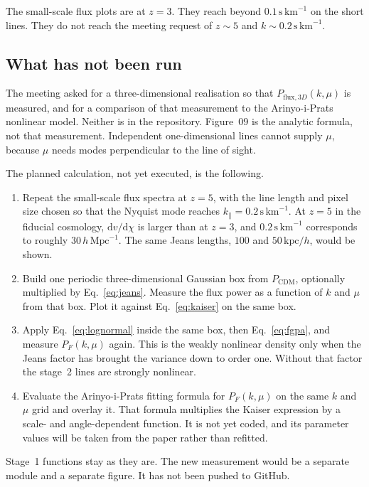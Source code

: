 \documentclass[11pt]{article}
\begin{document}
The small-scale flux plots are at $z=3$. They reach beyond $0.1\,\mathrm{s\,km}^{-1}$ on the short lines. They do not reach the meeting request of $z\sim 5$ and $k\sim 0.2\,\mathrm{s\,km}^{-1}$.

\subsection{What has not been run}

The meeting asked for a three-dimensional realisation so that $P_{\mathrm{flux},3D}(k,\mu)$ is measured, and for a comparison of that measurement to the Arinyo-i-Prats nonlinear model. Neither is in the repository. Figure~09 is the analytic formula, not that measurement. Independent one-dimensional lines cannot supply $\mu$, because $\mu$ needs modes perpendicular to the line of sight.

The planned calculation, not yet executed, is the following.

\begin{enumerate}
\item Repeat the small-scale flux spectra at $z=5$, with the line length and pixel size chosen so that the Nyquist mode reaches $k_\parallel=0.2\,\mathrm{s\,km}^{-1}$. At $z=5$ in the fiducial cosmology, $\mathrm{d}v/\mathrm{d}\chi$ is larger than at $z=3$, and $0.2\,\mathrm{s\,km}^{-1}$ corresponds to roughly $30\,h\,\mathrm{Mpc}^{-1}$. The same Jeans lengths, $100$ and $50\,\mathrm{kpc}/h$, would be shown.
\item Build one periodic three-dimensional Gaussian box from $P_\mathrm{CDM}$, optionally multiplied by Eq.~\eqref{eq:jeans}. Measure the flux power as a function of $k$ and $\mu$ from that box. Plot it against Eq.~\eqref{eq:kaiser} on the same box.
\item Apply Eq.~\eqref{eq:lognormal} inside the same box, then Eq.~\eqref{eq:fgpa}, and measure $P_F(k,\mu)$ again. This is the weakly nonlinear density only when the Jeans factor has brought the variance down to order one. Without that factor the stage~2 lines are strongly nonlinear.
\item Evaluate the Arinyo-i-Prats fitting formula for $P_F(k,\mu)$ on the same $k$ and $\mu$ grid and overlay it. That formula multiplies the Kaiser expression by a scale- and angle-dependent function. It is not yet coded, and its parameter values will be taken from the paper rather than refitted.
\end{enumerate}

Stage~1 functions stay as they are. The new measurement would be a separate module and a separate figure. It has not been pushed to GitHub.
\end{document}
